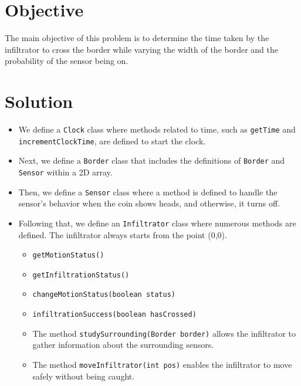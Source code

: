 \documentclass[12pt,a4paper]{article}
\begin{document}
\section{Objective}\label{sec:objective}
The main objective of this problem is to determine the time taken by the infiltrator to cross the border while varying the width of the border and the probability of the sensor being on.

\section{Solution }\label{sec:discussion}
\begin{itemize}
\item We define a \texttt{Clock} class where methods related to time, such as \texttt{getTime} and \texttt{incrementClockTime}, are defined to start the clock.

\item Next, we define a \texttt{Border} class that includes the definitions of \texttt{Border} and \texttt{Sensor} within a 2D array.

\item Then, we define a \texttt{Sensor} class where a method is defined to handle the sensor's behavior when the coin shows heads, and otherwise, it turns off.

\item Following that, we define an \texttt{Infiltrator} class where numerous methods are defined. The infiltrator always starts from the point (0,0).

    \begin{itemize}
        \item \texttt{getMotionStatus()}
        \item \texttt{getInfiltrationStatus()}
        \item \texttt{changeMotionStatus(boolean status)}
        \item \texttt{infiltrationSuccess(boolean hasCrossed)}
    
    \item The method \texttt{studySurrounding(Border border)} allows the infiltrator to gather information about the surrounding sensors.
    \item The method \texttt{moveInfiltrator(int pos)} enables the infiltrator to move safely without being caught.
    \end{itemize}
\end{itemize}
\end{document}
